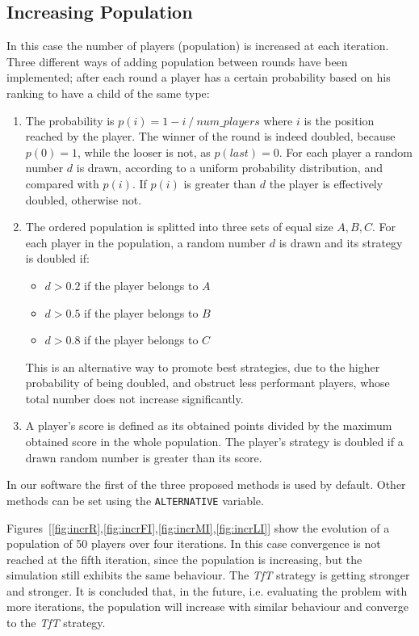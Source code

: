 \documentclass[journal,a4paper,10pt,twoside]{IEEEtran} %
\begin{document}
\subsection{Increasing Population}
In this case the number of players (population) is increased at each iteration. Three different ways of adding population between rounds have been implemented; after each round a player has a certain probability based on his ranking to have a child of the same type:
\begin{enumerate}
    \item The probability is $p(i)=1- i\ /\ num\_players$ where $i$ is the position reached by the player. The winner of the round is indeed doubled, because $p(0)=1$, while the looser is not, as $p(last)=0$.
    For each player a random number $d$ is drawn, according to a uniform probability distribution, and compared with $p(i)$. If $p(i)$ is greater than $d$ the player is effectively doubled, otherwise not.
    \item The ordered population is splitted into three sets of equal size $A,B,C$. For each player in the population, a random number $d$ is drawn and its strategy is doubled if:
    \begin{itemize}
        \item $d>0.2$ if the player belongs to $A$
        \item $d>0.5$ if the player belongs to $B$
        \item $d>0.8$ if the player belongs to $C$
    \end{itemize}
    This is an alternative way to promote best strategies, due to the higher probability of being doubled, and obstruct less performant players, whose total number does not increase significantly.
    \item A player's score is defined as its obtained points divided by the maximum obtained score in the whole population. The player's strategy is doubled if a drawn random number is greater than its score.
\end{enumerate}

In our software the first of the three proposed methods is used by default. Other methods can be set using the \texttt{ALTERNATIVE} variable.

Figures~[\ref{fig:incrR},\ref{fig:incrFI},\ref{fig:incrMI},\ref{fig:incrLI}] show the evolution of a population of 50 players over four iterations. In this case convergence is not reached at the fifth iteration, since the population is increasing, but the simulation still exhibits the same behaviour. The \textit{TfT} strategy is getting stronger and stronger. It is concluded that, in the future, i.e. evaluating the problem with more iterations, the population will increase with similar behaviour and converge to the \textit{TfT} strategy.
\end{document}

